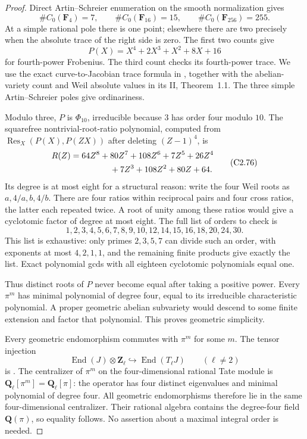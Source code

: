 \begin{proof}
Direct Artin--Schreier enumeration on the smooth
normalization gives
\[
 \#C_0(\mathbf F_4)=7,\qquad
 \#C_0(\mathbf F_{16})=15,\qquad
 \#C_0(\mathbf F_{256})=255.
\]
At a simple rational pole there is one point;
elsewhere there are two precisely when the
absolute trace of the right side is zero.
The first two counts give
\[
           P(X)=X^4+2X^3+X^2+8X+16                     \tag{C2.75}
\]
for fourth-power Frobenius. The third count checks
its fourth-power trace. We use the exact
curve-to-Jacobian trace formula in
\cite[III, Theorem~11.1 and Corollary~11.4]{A_Milne2008},
together with the abelian-variety count and Weil
absolute values in its II, Theorem~1.1.
The three simple Artin--Schreier poles give
ordinariness.

Modulo three, $P$ is $\Phi_{10}$, irreducible
because $3$ has order four modulo $10$.
The squarefree nontrivial-root-ratio polynomial,
computed from $\operatorname{Res}_X(P(X),P(ZX))$
after deleting $(Z-1)^4$, is
\[
 \begin{split}
 R(Z)={}&64Z^8+80Z^7+108Z^6+7Z^5+26Z^4\\
        &\hspace{12mm}+7Z^3+108Z^2+80Z+64.
 \end{split}                                           \tag{C2.76}
\]
Its degree is at most eight for a structural
reason: write the four Weil roots as
$a,4/a,b,4/b$. There are four ratios within
reciprocal pairs and four cross ratios, the
latter each repeated twice. A root of unity
among these ratios would give a cyclotomic
factor of degree at most eight. The full list
of orders to check is
\[
 1,2,3,4,5,6,7,8,9,10,12,14,15,16,18,20,24,30.
\]
This list is exhaustive: only primes $2,3,5,7$
can divide such an order, with exponents at
most $4,2,1,1$, and the remaining finite
products give exactly the list. Exact
polynomial gcds with all eighteen cyclotomic
polynomials equal one.

Thus distinct roots of $P$ never become equal
after taking a positive power. Every $\pi^m$
has minimal polynomial of degree four, equal
to its irreducible characteristic polynomial.
A proper geometric abelian subvariety would
descend to some finite extension and factor
that polynomial. This proves geometric
simplicity.

Every geometric endomorphism commutes with
$\pi^m$ for some $m$. The tensor injection
\[
 \operatorname{End}(J)\otimes\mathbf Z_\ell
          \hookrightarrow\operatorname{End}(T_\ell J)
 \qquad(\ell\ne2)
\]
is \cite[I, Theorem~10.15, printed p.~49]{A_Milne2008}.
The centralizer of $\pi^m$ on the
four-dimensional rational Tate module is
$\mathbf Q_\ell[\pi^m]=\mathbf Q_\ell[\pi]$:
the operator has four distinct eigenvalues
and minimal polynomial of degree four.
All geometric endomorphisms therefore lie in
the same four-dimensional centralizer.
Their rational algebra contains the
degree-four field $\mathbf Q(\pi)$, so
equality follows. No assertion about a
maximal integral order is needed.


\end{proof}
